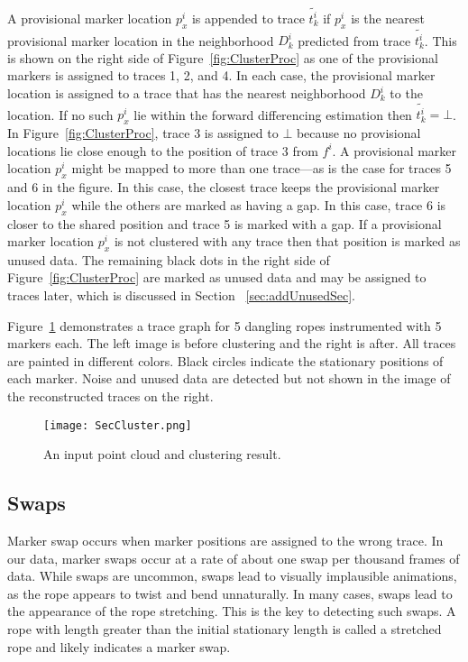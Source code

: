 A provisional marker location $p_x^i$ is appended to trace $\tilde{t_k^i }$ if $p_x^i$ is the nearest provisional marker location in the neighborhood $D_k^i$ predicted from trace $\tilde{t_k^i}$.  This is shown on the right side of Figure~\ref{fig:ClusterProc} as one of the provisional markers is assigned to traces 1, 2, and 4. In each case, the provisional marker location is assigned to a trace that has the nearest neighborhood $D_k^i$ to the location.  If no such $p_x^i$ lie within the forward differencing estimation then $\tilde{t_k^i}=\bot$. In Figure~\ref{fig:ClusterProc}, trace 3 is assigned to $\bot$ because no provisional locations lie close enough to the position of trace 3 from $f^i$.  A provisional marker location $p_x^i$ might be mapped to more than one trace---as is the case for traces 5 and 6 in the figure. In this case, the closest trace keeps the provisional marker location $p_x^i$ while the others are marked as having a gap. In this case, trace 6 is closer to the shared position and trace 5 is marked with a gap. If a provisional marker location $p_x^i$ is not clustered with any trace then that position is marked as unused data. The remaining black dots in the right side of Figure~\ref{fig:ClusterProc} are marked as unused data and may be assigned to traces later, which is discussed in Section ~\ref{sec:addUnusedSec}.  

Figure~\ref{fig:SecCluster} demonstrates a trace graph for 5 dangling ropes instrumented with 5 markers each. The left image is before clustering and the right is after. All traces are painted in different colors. Black circles indicate the stationary positions of each marker. Noise and unused data are detected but not shown in the image of the reconstructed traces on the right. 

\begin{figure}[tb]
\texttt{[image: SecCluster.png]}
\caption{An input point cloud and clustering result.}
\label{fig:SecCluster} 
\end{figure}

\subsection{Swaps}

Marker swap occurs when marker positions are assigned to the wrong trace.  In our data, marker swaps occur at a rate of about one swap per thousand frames of data.  While swaps are uncommon, swaps lead to visually implausible animations, as the rope appears to twist and bend unnaturally.  In many cases, swaps lead to the appearance of the rope stretching. This is the key to detecting such swaps. A rope with length greater than the initial stationary length is called a stretched rope and likely indicates a marker swap.  

